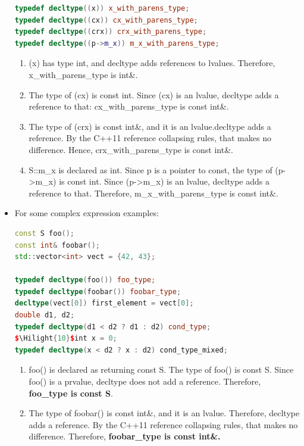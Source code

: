 \documentclass[a4paper,11pt,twoside]{book}
\newcommand{\Hilight}[1]{\makebox[0pt][l]{\color{yellow}\rule[-3pt]{#1em}{11pt}}}
\newcommand{\Hilight}[1]{}
\begin{document}
\begin{itemize}
\begin{lstlisting}[frame=single, language=c++]
typedef decltype((x)) x_with_parens_type;
typedef decltype((cx)) cx_with_parens_type;
typedef decltype((crx)) crx_with_parens_type;
typedef decltype((p->m_x)) m_x_with_parens_type;
\end{lstlisting}
	\begin{enumerate}
		\item  (x) has type int, and decltype adds references to lvalues. Therefore, x\_with\_parens\_type is int\&.
		
		\item The type of (cx) is const int. Since (cx) is an lvalue, decltype adds a reference to that: cx\_with\_parens\_type is const int\&.
		
		\item  The type of (crx) is const int\&, and it is an lvalue.decltype adds a reference. By the C++11 reference collapsing rules, that makes no difference. Hence, crx\_with\_parens\_type is const int\&.
		
		\item S::m\_x is declared as int. Since p is a pointer to const, the type of (p->m\_x) is const int. Since (p->m\_x) is an lvalue, decltype adds a reference to that. Therefore, m\_x\_with\_parens\_type is const int\&.
	\end{enumerate}

\item For some complex expression examples:
\begin{lstlisting}[frame=single, language=c++]
const S foo();
const int& foobar();
std::vector<int> vect = {42, 43};

typedef decltype(foo()) foo_type;
typedef decltype(foobar()) foobar_type;
decltype(vect[0]) first_element = vect[0];
double d1, d2;
typedef decltype(d1 < d2 ? d1 : d2) cond_type;
$\Hilight{10}$int x = 0;
typedef decltype(x < d2 ? x : d2) cond_type_mixed;
\end{lstlisting}

	\begin{enumerate}
		\item foo() is declared as returning const S. The type of foo()
is const S. Since foo() is a prvalue, decltype does not
add a reference. Therefore, \textbf{foo\_type is const S}.
		
		\item The type of foobar() is const int\&, and it is an lvalue. Therefore, decltype adds a reference. By the C++11 reference collapsing rules, that makes no difference. Therefore, \textbf{foobar\_type is const int\&.}
		

\end{enumerate}
\end{itemize}
\end{document}
